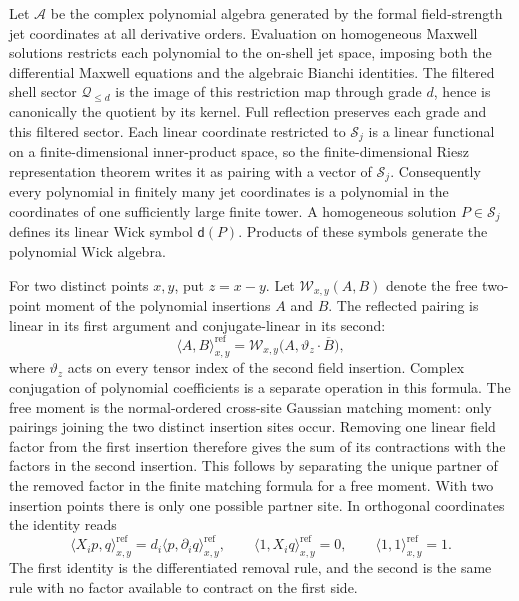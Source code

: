 Let $\mathscr A$ be the complex polynomial algebra generated by the formal
field-strength jet coordinates at all derivative orders. Evaluation on
homogeneous Maxwell solutions restricts each polynomial to the on-shell
jet space, imposing both the differential Maxwell equations and the
algebraic Bianchi identities. The filtered shell sector $\mathscr Q_{\le d}$
is the image of this restriction map through grade $d$, hence is canonically
the quotient by its kernel. Full reflection preserves each grade and this
filtered sector. Each linear coordinate restricted to $\mathscr S_j$ is a
linear functional on a finite-dimensional inner-product space, so the
finite-dimensional Riesz representation theorem writes it as pairing with
a vector of $\mathscr S_j$. Consequently every polynomial in finitely many
jet coordinates is a polynomial in the coordinates of one sufficiently
large finite tower. A homogeneous solution $P\in\mathscr S_j$
defines its linear Wick symbol $\mathsf d(P)$. Products of these symbols
generate the polynomial Wick algebra.

For two distinct points $x,y$, put $z=x-y$. Let
$\mathcal W_{x,y}(A,B)$ denote the free two-point moment of the polynomial
insertions $A$ and $B$. The reflected pairing is linear in its first
argument and conjugate-linear in its second:
\[
\langle A,B\rangle_{x,y}^{\mathrm{ref}}
   =\mathcal W_{x,y}\bigl(A,\vartheta_z\cdot\overline{B}\bigr),
\]
where $\vartheta_z$ acts on every tensor index of the second field
insertion. Complex conjugation of polynomial coefficients is a separate
operation in this formula. The free moment is the normal-ordered cross-site
Gaussian matching moment: only pairings joining the two distinct insertion
sites occur. Removing one linear field factor from the first insertion
therefore gives the sum of its contractions with the factors in the second
insertion. This follows by separating the unique partner of the removed
factor in the finite matching formula for a free moment. With two insertion
points there is only one possible partner site. In orthogonal coordinates
the identity reads
\begin{equation}\label{eq:ex-lattice-script-recurrence}
 \langle X_i p,q\rangle_{x,y}^{\mathrm{ref}}
   =d_i\langle p,\partial_iq\rangle_{x,y}^{\mathrm{ref}},
 \qquad
 \langle1,X_iq\rangle_{x,y}^{\mathrm{ref}}=0,
 \qquad \langle1,1\rangle_{x,y}^{\mathrm{ref}}=1.
\end{equation}
The first identity is the differentiated removal rule, and the second is
the same rule with no factor available to contract on the first side.

